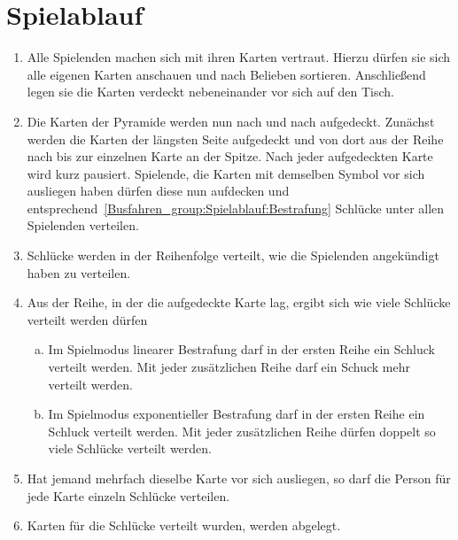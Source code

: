 \section{Spielablauf}
\begin{enumerate}[label={(\arabic*)}]
    \item
    Alle Spielenden machen sich mit ihren Karten vertraut.
    Hierzu dürfen sie sich alle eigenen Karten anschauen und nach Belieben sortieren.
    Anschließend legen sie die Karten verdeckt nebeneinander vor sich auf den Tisch.

    \item
    Die Karten der Pyramide werden nun nach und nach aufgedeckt.
    Zunächst werden die Karten der längsten Seite aufgedeckt und von dort aus der Reihe nach bis zur einzelnen Karte an der Spitze.
    Nach jeder aufgedeckten Karte wird kurz pausiert.
    Spielende, die Karten mit demselben Symbol vor sich ausliegen haben dürfen diese nun aufdecken und entsprechend~\ref{Busfahren_group:Spielablauf:Bestrafung} Schlücke unter allen Spielenden verteilen.

    \item Schlücke werden in der Reihenfolge verteilt, wie die Spielenden angekündigt haben zu verteilen.

    \item\label{Busfahren_group:Spielablauf:Bestrafung}
    Aus der Reihe, in der die aufgedeckte Karte lag, ergibt sich wie viele Schlücke verteilt werden dürfen
    \begin{enumerate}[a.]
        \item \label{Busfahren_group:Spielablauf:Bestrafung:linear}
        Im Spielmodus linearer Bestrafung darf in der ersten Reihe ein Schluck verteilt werden.
        Mit jeder zusätzlichen Reihe darf ein Schuck mehr verteilt werden.    
        \item \label{Busfahren_group:Spielablauf:Bestrafung:exponentiell}
        Im Spielmodus exponentieller Bestrafung darf in der ersten Reihe ein Schluck verteilt werden.
        Mit jeder zusätzlichen Reihe dürfen doppelt so viele Schlücke verteilt werden.
    \end{enumerate}

    \item 
    Hat jemand mehrfach dieselbe Karte vor sich ausliegen, so darf die Person für jede Karte einzeln Schlücke verteilen.

    \item
    Karten für die Schlücke verteilt wurden, werden abgelegt.


\end{enumerate}

